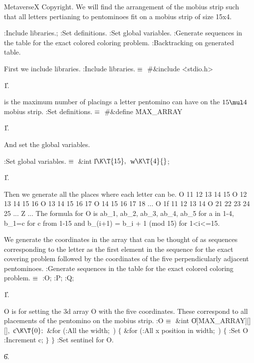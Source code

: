 

MetaverseX Copyright. We will find the arrangement of the mobius strip
such that all letters pertianing to pentominoes fit on a mobius strip of size
15x4.

\Y\B{}:Include libraries.\X;\6
:Set definitions.\X\6
:Set global variables.\X\6
:Generate sequences in the table for the exact colored coloring problem.\X\6
:Backtracking on generated table.\X\par
\fi

First we include libraries.
\Y\B\4:Include libraries.\X${}\equiv{}$\6
\8\#\&{include} \.{<stdio.h>}\par
\U1.\fi

 is the maximum number of placings a letter pentomino
can have on the $15 \mul 4$ mobius strip.
\Y\B\4:Set definitions.\X${}\equiv{}$\6
\8\#\&{define} \.{MAX\_ARRAY}\5\par
\U1.\fi

And set the global variables.

\Y\B\4:Set global variables.\X${}\equiv{}$\6
\&{int} \|l${}\K\T{15},{}$ \|w${}\K\T{4}{}$;\par
\U1.\fi

Then we generate all the places where each letter can be.
O 11 12 13 14 15
O 12 13 14 15 16
O 13 14 15 16 17
O 14 15 16 17 18
...
O 1f 11 12 13 14
O 21 22 23 24 25
...
Z ...
The formula for O is ab_1, ab_2, ab_3, ab_4, ab_5 for a in 1-4, b_1=c for c
from 1-15 and b_(i+1) = b_i + 1 (mod 15) for 1<i<=15.
\fi

We generate the coordinates in the array that can be thought of as
sequences corresponding to the letter as the first element in the sequence for
the exact covering problem followed by the coordinates of the five
perpendicularly adjacent pentominoes.
\Y\B\4:Generate sequences in the table for the exact colored coloring
problem.\X${}\equiv{}$\6
:O\X;\6
:P\X;\6
:Q\X;\par
\U1.\fi

O is for setting the 3d array O with the five coordinates. These
correspond to all placements of the pentomino on the mobius strip.
\Y\B\4:O\X${}\equiv{}$\6
\&{int} \|O[\.{MAX\_ARRAY}][][]${},{}$ \|c${}\K\T{0};{}$\7
\&{for} (:All the width\X;\6
\,)\5
${}\{{}$\1\6
\&{for} (:All x position in width\X;\6
\,)\5
${}\{{}$\1\6
:Set O\X\6
:Increment c\X;\6
\4${}\}{}$\2\6
\4${}\}{}$\2\6
:Set sentinel for O.\X\par
\U6.\fi

